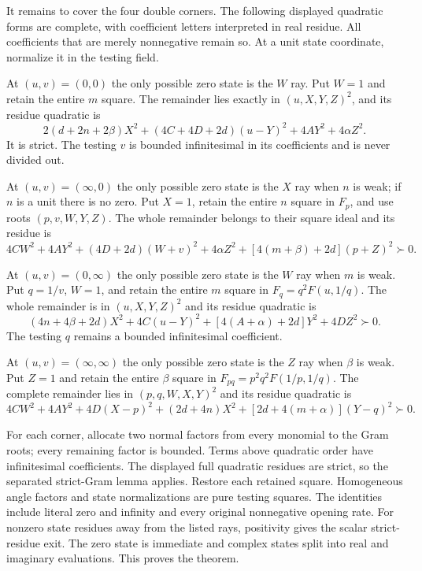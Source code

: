 It remains to cover the four double corners. The following displayed
quadratic forms are complete, with coefficient letters interpreted in
real residue. All coefficients that are merely nonnegative remain so.
At a unit state coordinate, normalize it in the testing field.

At $(u,v)=(0,0)$ the only possible zero state is the $W$ ray.
Put $W=1$ and retain the entire $m$ square. The remainder lies
exactly in $(u,X,Y,Z)^2$, and its residue quadratic is
\[
 2(d+2n+2\beta)X^2+(4C+4D+2d)(u-Y)^2+4AY^2+4\alpha Z^2.
\]
It is strict. The testing $v$ is bounded infinitesimal in its
coefficients and is never divided out.

At $(u,v)=(\infty,0)$ the only possible zero state is the $X$ ray
when $n$ is weak; if $n$ is a unit there is no zero. Put $X=1$,
retain the entire $n$ square in $F_p$, and use roots $(p,v,W,Y,Z)$.
The whole remainder belongs to their square ideal and its residue is
\[
 4CW^2+4AY^2+(4D+2d)(W+v)^2
                 +4\alpha Z^2+[4(m+\beta)+2d](p+Z)^2\succ0.
\]

At $(u,v)=(0,\infty)$ the only possible zero state is the $W$ ray
when $m$ is weak. Put $q=1/v$, $W=1$, and retain the entire $m$
square in $F_q=q^2F(u,1/q)$. The whole remainder is in
$(u,X,Y,Z)^2$ and its residue quadratic is
\[
 (4n+4\beta+2d)X^2+4C(u-Y)^2+[4(A+\alpha)+2d]Y^2+4DZ^2\succ0.
\]
The testing $q$ remains a bounded infinitesimal coefficient.

At $(u,v)=(\infty,\infty)$ the only possible zero state is the $Z$
ray when $\beta$ is weak. Put $Z=1$ and retain the entire $\beta$
square in $F_{pq}=p^2q^2F(1/p,1/q)$. The complete remainder lies
in $(p,q,W,X,Y)^2$ and its residue quadratic is
\[
 4CW^2+4AY^2+4D(X-p)^2+(2d+4n)X^2
                            +[2d+4(m+\alpha)](Y-q)^2\succ0.
\]

For each corner, allocate two normal factors from every monomial to
the Gram roots; every remaining factor is bounded. Terms above
quadratic order have infinitesimal coefficients. The displayed full
quadratic residues are strict, so the separated strict-Gram lemma
applies. Restore each retained square. Homogeneous angle factors and
state normalizations are pure testing squares. The identities include
literal zero and infinity and every original nonnegative opening rate.
For nonzero state residues away from the listed rays, positivity gives
the scalar strict-residue exit. The zero state is immediate and complex
states split into real and imaginary evaluations. This proves the theorem.



